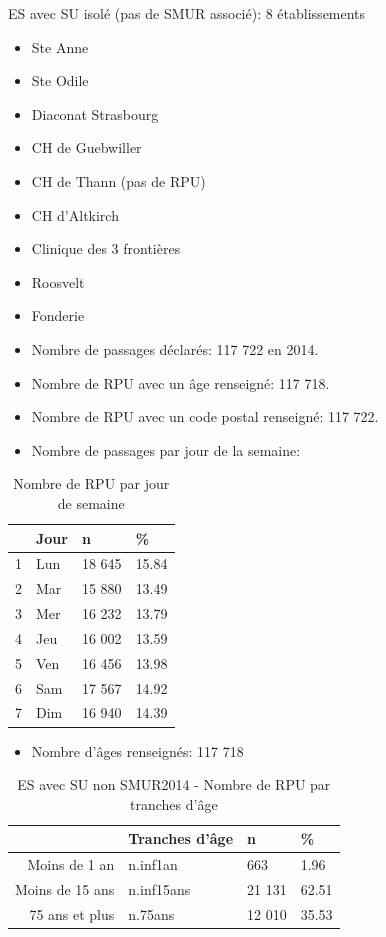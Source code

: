 \documentclass[]{article}
\begin{document}
ES avec SU isolé (pas de SMUR associé): 8 établissements

\begin{itemize}
\item
  Ste Anne
\item
  Ste Odile
\item
  Diaconat Strasbourg
\item
  CH de Guebwiller
\item
  CH de Thann (pas de RPU)
\item
  CH d'Altkirch
\item
  Clinique des 3 frontières
\item
  Roosvelt
\item
  Fonderie
\item
  Nombre de passages déclarés: 117 722 en 2014.
\item
  Nombre de RPU avec un âge renseigné: 117 718.
\item
  Nombre de RPU avec un code postal renseigné: 117 722.
\item
  Nombre de passages par jour de la semaine:
\end{itemize}

\begin{table}[ht]
\centering
\begin{tabular}{rlll}
  \hline
 & Jour & n & \% \\ 
  \hline
1 & Lun & 18 645 & 15.84 \\ 
  2 & Mar & 15 880 & 13.49 \\ 
  3 & Mer & 16 232 & 13.79 \\ 
  4 & Jeu & 16 002 & 13.59 \\ 
  5 & Ven & 16 456 & 13.98 \\ 
  6 & Sam & 17 567 & 14.92 \\ 
  7 & Dim & 16 940 & 14.39 \\ 
   \hline
\end{tabular}
\caption{Nombre de RPU par jour de semaine} 
\end{table}

\begin{itemize}
\itemsep1pt\parskip0pt
\item
  Nombre d'âges renseignés: 117 718
\end{itemize}

\begin{table}[ht]
\centering
\begin{tabular}{rlll}
  \hline
 & Tranches d'âge & n & \% \\ 
  \hline
Moins de 1 an & n.inf1an &    663 & 1.96 \\ 
  Moins de 15 ans & n.inf15ans & 21 131 & 62.51 \\ 
  75 ans et plus & n.75ans & 12 010 & 35.53 \\ 
   \hline
\end{tabular}
\caption{ES avec SU non SMUR2014 - Nombre de RPU par tranches d'âge} 
\end{table}
\end{document}
